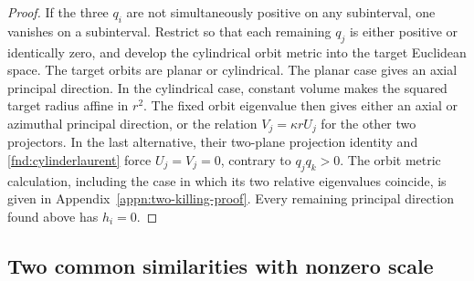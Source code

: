 \documentclass[11pt,a4paper]{article}
\numberwithin{equation}{section}
\theoremstyle{plain}
\theoremstyle{definition}
\theoremstyle{remark}
\begin{document}
\begin{proof}
If the three $q_i$ are not simultaneously positive on any
subinterval, one vanishes on a subinterval. Restrict so that each
remaining $q_j$ is either positive or identically zero, and develop
the cylindrical orbit metric into the
target Euclidean space. The target orbits are planar or cylindrical.
The planar case gives an axial principal direction. In the
cylindrical case, constant volume makes the squared target radius
affine in $r^2$. The fixed orbit eigenvalue then gives either an
axial or azimuthal principal direction, or the relation
$V_j=\kappa rU_j$ for the other two projectors. In the last
alternative, their two-plane projection identity and
\eqref{fnd:cylinderlaurent} force $U_j=V_j=0$, contrary to
$q_jq_k>0$. The orbit metric calculation, including the case in
which its two relative eigenvalues coincide, is given in
Appendix~\ref{appn:two-killing-proof}. Every remaining principal
direction found above has $h_i=0$.
\end{proof}

\subsection{Two common similarities with nonzero scale}
\end{document}
